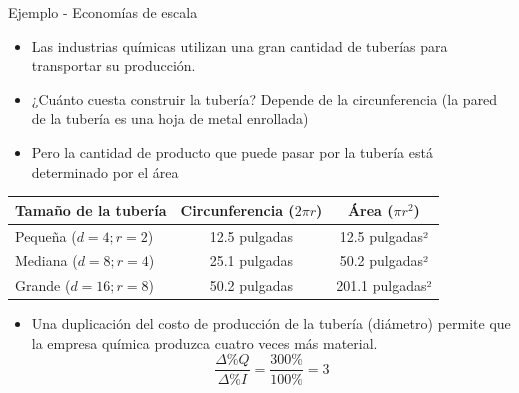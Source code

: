\documentclass{beamer}
\begin{document}
\begin{frame}{Ejemplo - Economías de escala}
    \begin{itemize}
    \item Las industrias químicas utilizan una gran cantidad de tuberías para transportar su producción. 
    \item ¿Cuánto cuesta construir la tubería? Depende de la circunferencia (la pared de la tubería es una hoja de metal enrollada)
    \item Pero la cantidad de producto que puede pasar por la tubería está determinado por el área
    \end{itemize}

    \begin{table}[h]
    \centering
    \renewcommand{\arraystretch}{1} %
    \begin{adjustbox}{width=0.8\textwidth}
    \begin{tabular}{lcc}
    \toprule
    \textbf{Tamaño de la tubería} & \textbf{Circunferencia (\(2\pi r\))} & \textbf{Área (\(\pi r^2\))} \\
    \midrule
    Pequeña ($d =4; r=2$) & 12.5 pulgadas  & 12.5 pulgadas²  \\
    Mediana ($d =8; r=4$) & 25.1 pulgadas  & 50.2 pulgadas²  \\
    Grande ($d =16; r=8$) & 50.2 pulgadas  & 201.1 pulgadas² \\
    \bottomrule
    \end{tabular}
    \end{adjustbox}
    \end{table}
    \centering
    \begin{itemize}
    \item Una duplicación del costo de producción de la tubería (diámetro) permite que la empresa química produzca cuatro veces más material. 
    \[ \frac{\Delta \% Q}{\Delta \% I} =\frac{ 300\% }{100\%}=3\]
    \end{itemize}
\end{frame}
\end{document}
